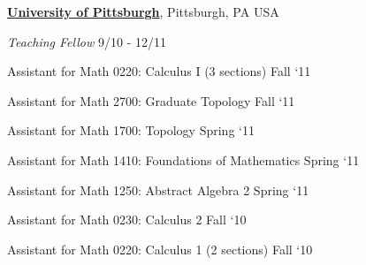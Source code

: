 \documentclass[10pt]{article}
\newlength{\footpageshift}
\newenvironment{outerlist}[1][\enskip\textbullet]%
        {\begin{itemize}[#1]}{\end{itemize}%
         \vspace{-.6\baselineskip}}
\newenvironment{innerlist}[1][\enskip\textbullet]%
        {\begin{compactitem}[#1]}{\end{compactitem}}
\begin{document}
%

\href{http://www.pitt.edu}{\textbf{University of Pittsburgh}},
Pittsburgh, PA USA
\begin{outerlist}

\item[] \textit{Teaching Fellow}%
\hspace{\footpageshift}\textrm{9/10 - 12/11}
    \begin{innerlist}[-]
     \item Assistant for Math 0220: Calculus I  (3 sections) \hfill Fall `11
     \item Assistant for Math 2700: Graduate Topology \hfill Fall `11
    \item Assistant for Math 1700: Topology \hfill Spring `11
    \item Assistant for Math 1410: Foundations of Mathematics \hfill Spring `11
    \item Assistant for Math 1250: Abstract Algebra 2 \hfill Spring `11
        \item Assistant for Math 0230: Calculus 2 \hfill Fall `10



        \item Assistant for Math 0220:  Calculus 1  (2 sections) \hfill Fall `10



\end{innerlist}
\end{outerlist}
\end{document}
